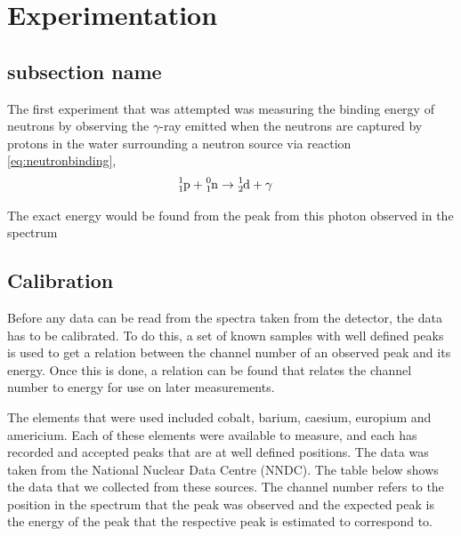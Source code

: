 
\section{Experimentation} %
\label{sec:experimentation}

\subsection{subsection name} %
\label{sub:subsection_name}
The first experiment that was attempted was measuring the binding energy of neutrons by observing the $\gamma$-ray emitted when the neutrons are captured by protons in the water surrounding a neutron source via reaction \ref{eq:neutronbinding},
\begin{align}
	\cf{^{1}_{1}p} + \cf{^{0}_{1}n} &\rightarrow \cf{^{1}_{2}d} + \gamma \label{eq:neutronbinding}
\end{align}

The exact energy would be found from the peak from this photon observed in the spectrum

\subsection{Calibration} %
\label{sub:calibration}
Before any data can be read from the spectra taken from the detector, the data has to be calibrated. To do this, a set of known samples with well defined peaks is used to get a relation between the channel number of an observed peak and its energy. Once this is done, a relation can be found that relates the channel number to energy for use on later measurements.

The elements that were used included cobalt, barium, caesium, europium and americium. Each of these elements were available to measure, and each has recorded and accepted peaks that are at well defined positions. The data was taken from the National Nuclear Data Centre (NNDC). The table below shows the data that we collected from these sources. The channel number refers to the position in the spectrum that the peak was observed and the expected peak is the energy of the peak that the respective peak is estimated to correspond to.

